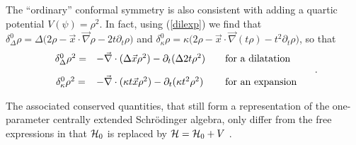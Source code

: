 \documentclass[a4paper,11pt]{article}
\def\p{{\partial}}
\def\vx{{\vec x}}
\def\vnabla{{\vec\nabla}}
\begin{document}

The ``ordinary'' conformal symmetry is also consistent with adding a
quartic potential $V(\psi)=\rho^2$.
In fact, using (\ref{dilexp}) we find that
$\delta^0_{\Delta}\rho=\Delta\big(2\rho
-\vx\cdot\vnabla\rho-2t\p_{t}\rho\big)$
and
$\delta^0_{\kappa}\rho=\kappa\big(2\rho
-\vx\cdot\vnabla(t\rho)-t^2\p_{t}\rho\big)$,
so that
\begin{equation}
     \begin{array}{ccc}
	\delta^0_{\Delta}\rho^{2}=
&-\vnabla\cdot(\Delta\vx\rho^2)-\p_{t}(\Delta 2t\rho^2)\quad\hfill
&\hbox{for a dilatation}\ \hfill
\\[10pt]
\delta^0_{\kappa}\rho^{2}=
&-\vnabla\cdot(\kappa t\vx\rho^2)-\p_{t}(\kappa t^2\rho^2)\hfill
&\hbox{for an expansion}\ \hfill
\end{array}\quad.
\label{confondens}
\end{equation}

The associated conserved quantities, that still
form a representation of the one-parameter centrally
extended Schr\"odinger algebra,
only differ from the free expressions in that
${\cal H}_{0}$ is replaced by ${\cal H}={\cal H}_{0}+V$ \cite{JBeg}.
\end{document}
